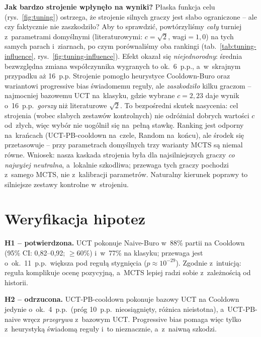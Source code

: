 \documentclass[12pt,a4paper]{article}
\begin{document}
\textbf{Jak bardzo strojenie wpłynęło na wyniki?} Płaska funkcja celu (rys.~\ref{fig:tuning})
ostrzega, że strojenie silnych graczy jest słabo ograniczone -- ale czy faktycznie nie zaszkodziło?
Aby to sprawdzić, powtórzyliśmy \emph{cały} turniej z~parametrami domyślnymi (literaturowymi:
$c{=}\sqrt2$, wagi${=}1{,}0$) na tych samych parach i~ziarnach, po czym porównaliśmy oba rankingi
(tab.~\ref{tab:tuning-influence}, rys.~\ref{fig:tuning-influence}). Efekt okazał się
\emph{niejednorodny}: średnia bezwzględna zmiana współczynnika wygranych to ok.\ 6~p.p., a~w~skrajnym
przypadku aż 16~p.p. Strojenie pomogło heurystyce Cooldown-Buro oraz wariantowi progressive bias
świadomemu reguły, ale \emph{zaszkodziło} kilku graczom -- najmocniej bazowemu UCT na~klasyku, gdzie
wybrane $c{=}2{,}23$ daje wynik o~16~p.p.\ \emph{gorszy} niż literaturowe $\sqrt2$. To bezpośredni
skutek nasycenia: cel strojenia (wobec słabych zestawów kontrolnych) nie odróżniał dobrych wartości
$c$ od~złych, więc wybór nie uogólnił się na~pełną stawkę. Ranking jest odporny na~krańcach
(UCT-PB-cooldown na~czele, Random na~końcu), ale środek się przetasowuje -- przy parametrach
domyślnych trzy warianty MCTS są niemal równe. Wniosek: nasza kaskada strojenia była dla
najsilniejszych graczy \emph{co najwyżej neutralna}, a~lokalnie szkodliwa; przewaga tych graczy
pochodzi z~samego MCTS, nie z~kalibracji parametrów. Naturalny kierunek poprawy to silniejsze zestawy
kontrolne w~strojeniu.





\section{Weryfikacja hipotez}\label{sec:weryfikacja}


\textbf{H1 -- potwierdzona.} UCT pokonuje Naive-Buro w~88\% partii na Cooldown (95\% CI:
0,82--0,92; $\geq$60\%) i~w~77\% na klasyku; przewaga jest o~ok.\ 11~p.p.\ większa pod regułą
stygnięcia ($p\!\approx\!10^{-29}$). Zgodnie z~intuicją: reguła komplikuje ocenę pozycyjną, a~MCTS
lepiej radzi sobie z~zależnością od historii.

\textbf{H2 -- odrzucona.} UCT-PB-cooldown pokonuje bazowy UCT na Cooldown jedynie o~ok.\ 4~p.p.\
(próg 10~p.p.\ nieosiągnięty, różnica nieistotna), a~UCT-PB-naive wręcz \emph{przegrywa} z~bazowym
UCT. Progressive bias pomaga więc tylko z~heurystyką świadomą reguły i~to nieznacznie, a~z~naiwną
szkodzi.
\end{document}
